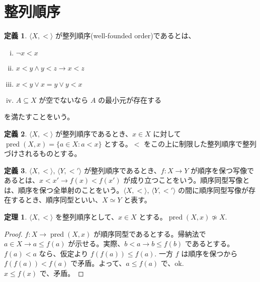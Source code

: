 \documentclass{jsarticle}
\theoremstyle{definition}
\newtheorem*{definition*}{定義}
\newtheorem{theorem}{定理}[section]
\begin{document}
    \section{整列順序}
    \begin{definition*} \label{well_founded_order}
        $\langle X, < \rangle$ が整列順序(well-founded order)であるとは、
        \begin{enumerate}[(i)]
            \item $\lnot x < x$
            \item $x < y \land y < z \rightarrow x < z$
            \item $x < y \lor x = y \lor y < x$
            \item $A \subseteq X$ が空でないなら $A$ の最小元が存在する
        \end{enumerate}
        を満たすことをいう。
    \end{definition*}
    
    \begin{definition*}
        $\langle X, < \rangle$ が整列順序であるとき、$x \in X$ に対して $\operatorname{pred}(X, x) = \{a \in X : a < x\}$ とする。$<$ をこの上に制限した整列順序で整列づけされるものとする。
    \end{definition*}

    \begin{definition*}
        $\langle X, < \rangle, \, \langle Y, <' \rangle$ が整列順序であるとき、$f : X \rightarrow Y$ が順序を保つ写像であるとは、$x < x' \rightarrow f(x) < f(x')$ が成り立つことをいう。順序同型写像とは、順序を保つ全単射のことをいう。$\langle X, < \rangle, \, \langle Y, <' \rangle$ の間に順序同型写像が存在するとき、順序同型といい、$X \simeq Y$ と表す。
    \end{definition*}

    \begin{theorem} \label{pred_not_isomorphic}
        $\langle X, < \rangle$ を整列順序として、$x \in X$ とする。$\operatorname{pred}(X, x) \not\simeq X.$
    \end{theorem}
    \begin{proof}
        $f : X \rightarrow \operatorname{pred}(X, x)$ が順序同型であるとする。帰納法で $a \in X \rightarrow a \leq f(a)$ が示せる。実際、$b < a \rightarrow b \leq f(b)$ であるとする。$f(a) < a$ なら、仮定より $f(f(a)) \leq f(a).$ 一方 $f$ は順序を保つから $f(f(a)) < f(a)$ で矛盾。よって、$a \leq f(a)$ で、ok.\\
        $x \leq f(x)$ で、矛盾。
    \end{proof}
\end{document}
